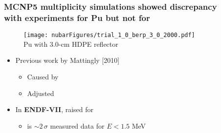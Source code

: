 \begin{frame}
    \frametitle{MCNP5 multiplicity simulations showed discrepancy \\ with experiments for
        Pu but not for }
\begin{minipage}{0.41\textwidth}
\begin{figure}[ht!]
\begin{center}
	{
	\texttt{[image: nubarFigures/trial\_1\_0\_berp\_3\_0\_2000.pdf]} \\
	{\footnotesize Pu with 3.0-cm HDPE reflector} }
\end{center}
\end{figure} 
\begin{figure}[ht!]
\begin{center}
\end{center}
\end{figure} 

\end{minipage}
\begin{minipage}{0.56\textwidth}
    {\fontsize{10.8pt}{10pt}\selectfont
    \addtolength\leftmargini{-0.5in}
     \addtolength\leftmarginii{-0.2in}
     \addtolength\wideitemsep{0.1in}
\begin{itemize}
  \item[] Previous work by Mattingly [2010]
      \vspace{-0.1in}
  \begin{itemize}
      \item Caused by \textbf{}  
	\vspace{-0.1505in}
	\item  Adjusted 	
	\end{itemize}
\item[]  In \textbf{ENDF-VII}, raised \nubar for  \\ 
    \vspace{0.1in}
  \begin{itemize}
 		\item \nubar is $\sim2\,\sigma$  measured data for $E < 1.5$ MeV 
	\end{itemize} 
\end{itemize} }
\end{minipage}
\end{frame} 
